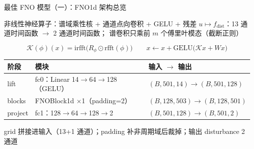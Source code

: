 \documentclass[aspectratio=169]{beamer}
\newcommand{\pos}[1]{\textcolor{blue!70!black}{#1}}
\begin{document}
\begin{frame}{最佳 FNO 模型（一）：FNO1d 架构总览}
  \begin{block}{非线性神经算子：谱域乘性核 + 通道点向卷积 + GELU + 残差}
    $u \mapsto f_{\mathrm{dist}}$：13 通道时间函数 $\to$ 2 通道时间函数；
    谱卷积只乘前 $m$ 个傅里叶模态（截断正则）
  \end{block}
  \begin{equation*}
    \mathcal{K}(\phi)(x)=\mathrm{irfft}\big(R_\phi \odot \mathrm{rfft}(\phi)\big)
    \qquad
    x \leftarrow x + \mathrm{GELU}\big(\mathcal{K}x + Wx\big)
  \end{equation*}
  \begin{table}
    \centering
    \small
    \begin{tabular}{lll}
      \toprule
      阶段 & 模块 & 输入 $\to$ 输出 \\
      \midrule
      lift & fc0：Linear 14$\to$64$\to$128（GELU） & $(B,501,14)\to(B,501,128)$ \\
      blocks & FNOBlock1d $\times$1（padding=2） & $(B,128,503)\to(B,128,501)$ \\
      project & fc1：128$\to$64$\to$128$\to$2 & $(B,501,128)\to(B,501,2)$ \\
      \bottomrule
    \end{tabular}
  \end{table}
  \vspace{1pt}
  \pos{grid 拼接进输入}（13+1 通道）；padding 补非周期域后裁掉；输出 disturbance 2 通道
\end{frame}
\end{document}
